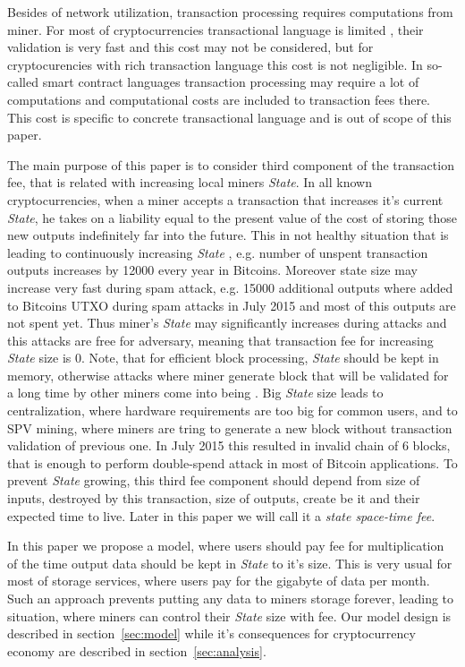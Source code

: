 \documentclass[]{article}   %
\newcommand{\authnote}[2]{\marginpar{\parbox{\marginparwidth}{\tiny %
  \textsf{#1 {\textcolor{blue}{notes: #2}}}}}%
  \textcolor{blue}{\textbf{\dag}}}
\newcommand{\authnote}[2]{
  \textsf{#1 \textcolor{blue}{: #2}}}
\newcommand{\authnote}[2]{}
\newcommand{\dnote}[1]{{\authnote{\textcolor{blue}{Dima notes}}{#1}}}
\newcommand{\state}{\textit{State}}
\begin{document}
Besides of network utilization, transaction processing requires computations from miner. For most of cryptocurrencies transactional language is limited \cite{script}, their validation is very fast and this cost may not be considered, but for cryptocurencies with rich transaction language \dnote{more links e.g. for sigma-state} this cost is not negligible. In so-called smart contract languages \cite{seijas2016scripting, tezosScript, solidity} transaction processing may require a lot of computations and computational costs are included to transaction fees there. This cost is specific to concrete transactional language and is out of scope of this paper.

The main purpose of this paper is to consider third component of the transaction fee, that is related with increasing local miners \state{}. In all known cryptocurrencies, when a miner accepts a transaction that increases it's current \state{}, he takes on a liability equal to the present value of the cost of storing those new outputs indefinitely far into the future. This in not healthy situation that is leading to continuously increasing \state{} \cite{utxoChart}, e.g. number of unspent transaction outputs increases by 12000 every year in Bitcoins. Moreover state size may increase very fast during spam attack, e.g. 15000 additional outputs where added to Bitcoins UTXO during spam attacks in July 2015 \cite{bitcoin2015flood} and most of this outputs are not spent yet. Thus miner's \state{} may significantly increases during attacks and this attacks are free for adversary, meaning that transaction fee for increasing \state{} size is 0. Note, that for efficient block processing, \state{} should be kept in memory, otherwise attacks where miner generate block that will be validated for a long time by other miners come into being \dnote{link to ethereum DoS, + others?}. Big \state{} size leads to centralization, where hardware requirements are too big for common users, and to SPV mining, where miners are tring to generate a new block without transaction validation of previous one. In July 2015 this resulted in invalid chain of 6 blocks\cite{spvMining}, that is enough to perform double-spend attack in most of Bitcoin applications. To prevent \state{} growing, this third fee component should depend from size of inputs, destroyed by this transaction, size of outputs, create be it and their expected time to live. Later in this paper we will call it a \textit{state space-time fee}.

In this paper we propose a model, where users should pay fee for multiplication of the time output data should be kept in \state{} to it's size. This is very usual for most of storage services, where users pay for the gigabyte of data per month. Such an approach prevents putting any data to miners storage forever, leading to situation, where miners can control their \state{} size with fee. Our model design is described in section~\ref{sec:model} while it's consequences for cryptocurrency economy are described in section~\ref{sec:analysis}.  \dnote{paper structure}
\end{document}
